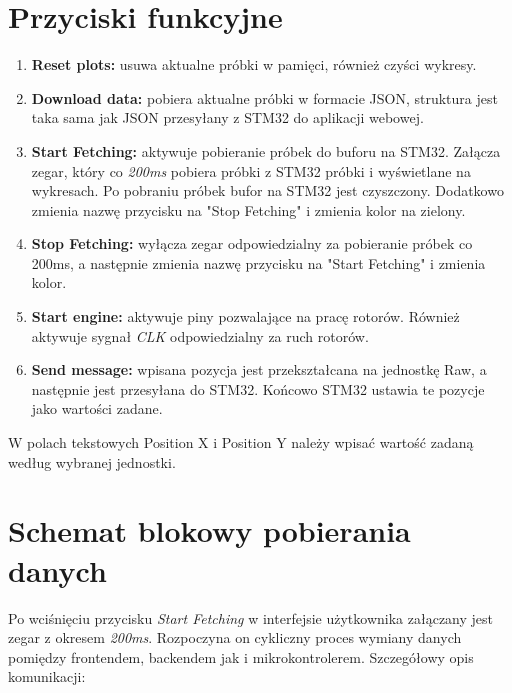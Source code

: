 \section{Przyciski funkcyjne}
\begin{enumerate}
    \item \textbf{Reset plots:} usuwa aktualne próbki w pamięci, również czyści wykresy.
    \item \textbf{Download data:} pobiera aktualne próbki w formacie JSON, struktura jest taka sama jak JSON przesyłany z STM32 do aplikacji webowej.
    \item \textbf{Start Fetching:} aktywuje pobieranie próbek do buforu na STM32. Załącza zegar, który co \textit{200ms} pobiera próbki z STM32 próbki i wyświetlane na wykresach. Po pobraniu próbek bufor na STM32 jest czyszczony. Dodatkowo zmienia nazwę przycisku na "Stop Fetching" i zmienia kolor na zielony.
    \item \textbf{Stop Fetching:} wyłącza zegar odpowiedzialny za pobieranie próbek co 200ms, a następnie zmienia nazwę przycisku na "Start Fetching" i zmienia kolor.
    \item \textbf{Start engine:} aktywuje piny pozwalające na pracę rotorów. Również aktywuje sygnał \textit{CLK} odpowiedzialny za ruch rotorów.
    \item \textbf{Send message:} wpisana pozycja jest przekształcana na jednostkę Raw, a następnie jest przesyłana do STM32. Końcowo STM32 ustawia te pozycje jako wartości zadane.
\end{enumerate}
W polach tekstowych Position X i Position Y należy wpisać wartość zadaną według wybranej jednostki.
\section{Schemat blokowy pobierania danych}
Po wciśnięciu przycisku \textit{Start Fetching} w interfejsie użytkownika załączany jest zegar z okresem \textit{200ms}. Rozpoczyna on cykliczny proces wymiany danych pomiędzy frontendem, backendem jak i mikrokontrolerem. Szczegółowy opis komunikacji:

